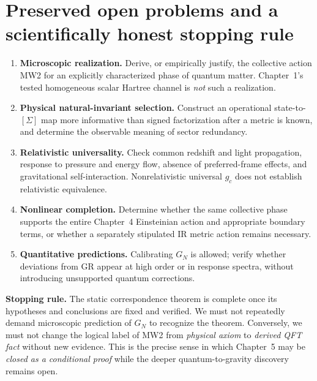 \documentclass[11pt,a4paper]{article}
\theoremstyle{remark}\newtheorem{remark}[theorem]{Remark}
\begin{document}
\section{Preserved open problems and a scientifically honest stopping rule}\label{sec:v30-ledger}
\begin{enumerate}[label=\textbf{O\arabic*.}]
\item \textbf{Microscopic realization.} Derive, or empirically justify, the collective action MW2 for an explicitly characterized phase of quantum matter. Chapter~1's tested homogeneous scalar Hartree channel is \emph{not} such a realization.
\item \textbf{Physical natural-invariant selection.} Construct an operational state-to-$[\Sigma]$ map more informative than signed factorization after a metric is known, and determine the observable meaning of sector redundancy.
\item \textbf{Relativistic universality.} Check common redshift and light propagation, response to pressure and energy flow, absence of preferred-frame effects, and gravitational self-interaction. Nonrelativistic universal $g_c$ does not establish relativistic equivalence.
\item \textbf{Nonlinear completion.} Determine whether the same collective phase supports the entire Chapter~4 Einsteinian action and appropriate boundary terms, or whether a separately stipulated IR metric action remains necessary.
\item \textbf{Quantitative predictions.} Calibrating $G_N$ is allowed; verify whether deviations from GR appear at high order or in response spectra, without introducing unsupported quantum corrections.
\end{enumerate}
\noindent\textbf{Stopping rule.} The static correspondence theorem is complete once its hypotheses and conclusions are fixed and verified. We must not repeatedly demand microscopic prediction of $G_N$ to recognize the theorem. Conversely, we must not change the logical label of MW2 from \emph{physical axiom} to \emph{derived QFT fact} without new evidence. This is the precise sense in which Chapter~5 may be \emph{closed as a conditional proof} while the deeper quantum-to-gravity discovery remains open.
\end{document}
